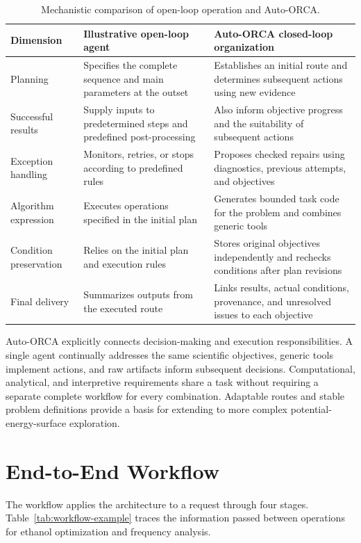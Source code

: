 \documentclass[a4paper,11pt]{article}
\begin{document}
\begin{table}[htbp]
  \centering\small
  \caption{Mechanistic comparison of open-loop operation and Auto-ORCA.}
  \label{tab:loop-comparison}
  \begin{tabularx}{\linewidth}{>{\raggedright\arraybackslash}p{2.35cm}YY}
    \toprule
    Dimension & Illustrative open-loop agent & Auto-ORCA closed-loop organization\\
    \midrule
    Planning & Specifies the complete sequence and main parameters at the outset & Establishes an initial route and determines subsequent actions using new evidence\\
    Successful results & Supply inputs to predetermined steps and predefined post-processing & Also inform objective progress and the suitability of subsequent actions\\
    Exception handling & Monitors, retries, or stops according to predefined rules & Proposes checked repairs using diagnostics, previous attempts, and objectives\\
    Algorithm expression & Executes operations specified in the initial plan & Generates bounded task code for the problem and combines generic tools\\
    Condition preservation & Relies on the initial plan and execution rules & Stores original objectives independently and rechecks conditions after plan revisions\\
    Final delivery & Summarizes outputs from the executed route & Links results, actual conditions, provenance, and unresolved issues to each objective\\
    \bottomrule
  \end{tabularx}
\end{table}

Auto-ORCA explicitly connects decision-making and execution responsibilities.
A single agent continually addresses the same scientific objectives, generic tools implement actions, and raw artifacts inform subsequent decisions.
Computational, analytical, and interpretive requirements share a task without requiring a separate complete workflow for every combination.
Adaptable routes and stable problem definitions provide a basis for extending to more complex potential-energy-surface exploration.

\section{End-to-End Workflow}
\label{sec:end-to-end-workflow}
The workflow applies the architecture to a request through four stages.
Table~\ref{tab:workflow-example} traces the information passed between operations for ethanol optimization and frequency analysis.
\end{document}
